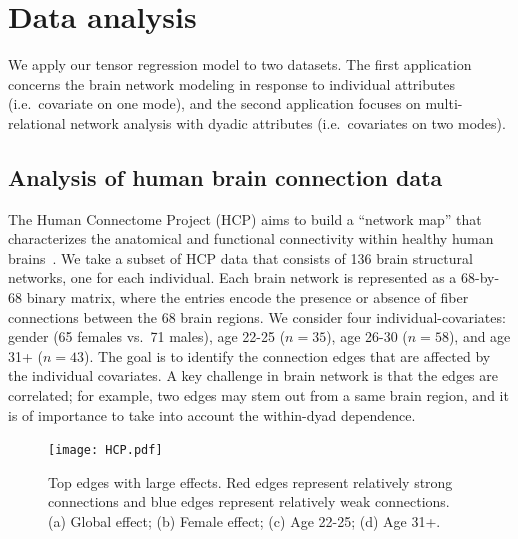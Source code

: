 \documentclass[12pt]{article}
\theoremstyle{plain}
\theoremstyle{definition}
\begin{document}
\section{Data analysis}\label{sec:data}
We apply our tensor regression model to two datasets. The first application concerns the brain network modeling in response to individual attributes (i.e.\ covariate on one mode), and the second application focuses on multi-relational network analysis with dyadic attributes (i.e.\ covariates on two modes). 

\subsection{Analysis of human brain connection data}
The Human Connectome Project (HCP) aims to build a ``network map'' that characterizes the anatomical and functional connectivity within healthy human brains~\citep{HCP}. We take a subset of HCP data that consists of 136 brain structural networks, one for each individual. Each brain network is represented as a 68-by-68 binary matrix, where the entries encode the presence or absence of fiber connections between the 68 brain regions. We consider four individual-covariates: gender (65 females vs.\ 71 males), age 22-25 ($n=35$), age 26-30 ($n=58$), and age 31+ ($n=43$). The goal is to identify the connection edges that are affected by the individual covariates. A key challenge in brain network is that the edges are correlated; for example, two edges may stem out from a same brain region, and it is of importance to take into account the within-dyad dependence. 


\begin{figure}[hbt]
\centering
\texttt{[image: HCP.pdf]}
\caption{Top edges with large effects. Red edges represent relatively strong connections and blue edges represent relatively weak connections. (a) Global effect; (b) Female effect; (c) Age 22-25; (d) Age 31+.}\label{fig:brain}
\end{figure}
\end{document}
